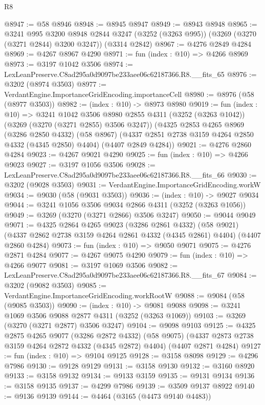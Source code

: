 \begin{lexlean}{R8}
\begin{coremodule}
@8947 := @58 @8946
@8948 := @8945 @8947
@8949 := @8943 @8948
@8965 := @3241
    @995
    @3200
    @8948
    @2844
    @3247
    (@3252 (@3263 @995))
    (@3269 (@3270 (@3271 @2844) @3200 @3247))
    (@3314 @2842)
@8967 := @4276 @2849 @4284
@8969 := @4267 @8967 @4290
@8971 := fun (index : @10) => @4266 @8969
@8973 := @3197 @1042 @3506
@8974 := LexLeanPreserve.C8ad295a0d9097be233aee06c62187366.R8.__fits_65
@8976 := @3202 (@8974 @3503)
@8977 := VerdantEngine.ImportanceGridEncoding.importanceCell
@8980 := @8976 (@58 (@8977 @3503))
@8982 := (index : @10) -> @8973 @8980
@9019 := fun (index : @10) =>
  @3241
    @1042
    @3506
    @8980
    @2855
    @4311
    (@3252 (@3263 @1042))
    (@3269 (@3270 (@3271 @2855) @3506 @3247))
    (@4325
      @2853
      @4265
      @8969
      (@3286 @2850 @4332)
      (@58 @8967)
      (@4337 @2851 @2738 @3159 @4264 @2850 @4332 (@4345 @2850) @4404)
      (@4407 @2849 @4284))
@9021 := @4276 @2860 @4284
@9023 := @4267 @9021 @4290
@9025 := fun (index : @10) => @4266 @9023
@9027 := @3197 @1056 @3506
@9028 := LexLeanPreserve.C8ad295a0d9097be233aee06c62187366.R8.__fits_66
@9030 := @3202 (@9028 @3503)
@9031 := VerdantEngine.ImportanceGridEncoding.workW
@9034 := @9030 (@58 (@9031 @3503))
@9036 := (index : @10) -> @9027 @9034
@9044 := @3241 @1056 @3506 @9034 @2866 @4311 (@3252 (@3263 @1056))
@9049 := @3269 (@3270 (@3271 @2866) @3506 @3247)
@9050 := @9044 @9049
@9071 := @4325
    @2864
    @4265
    @9023
    (@3286 @2861 @4332)
    (@58 @9021)
    (@4337 @2862 @2738 @3159 @4264 @2861 @4332 (@4345 @2861) @4404)
    (@4407 @2860 @4284)
@9073 := fun (index : @10) => @9050 @9071
@9075 := @4276 @2871 @4284
@9077 := @4267 @9075 @4290
@9079 := fun (index : @10) => @4266 @9077
@9081 := @3197 @1069 @3506
@9082 := LexLeanPreserve.C8ad295a0d9097be233aee06c62187366.R8.__fits_67
@9084 := @3202 (@9082 @3503)
@9085 := VerdantEngine.ImportanceGridEncoding.workRootW
@9088 := @9084 (@58 (@9085 @3503))
@9090 := (index : @10) -> @9081 @9088
@9098 := @3241 @1069 @3506 @9088 @2877 @4311 (@3252 (@3263 @1069))
@9103 := @3269 (@3270 (@3271 @2877) @3506 @3247)
@9104 := @9098 @9103
@9125 := @4325
    @2875
    @4265
    @9077
    (@3286 @2872 @4332)
    (@58 @9075)
    (@4337 @2873 @2738 @3159 @4264 @2872 @4332 (@4345 @2872) @4404)
    (@4407 @2871 @4284)
@9127 := fun (index : @10) => @9104 @9125
@9128 := @3158 @8098
@9129 := @4296 @7986
@9130 := @9128 @9129
@9131 := @3158 @9130
@9132 := @3160 @8920
@9133 := @3158 @9132
@9134 := @9133 @3159
@9135 := @9131 @9134
@9136 := @3158 @9135
@9137 := @4299 @7986
@9139 := @3509 @9137 @8922
@9140 := @9136 @9139
@9144 := @4464 (@3165 (@4473 @9140 @4483))

\end{coremodule}
\end{lexlean}
